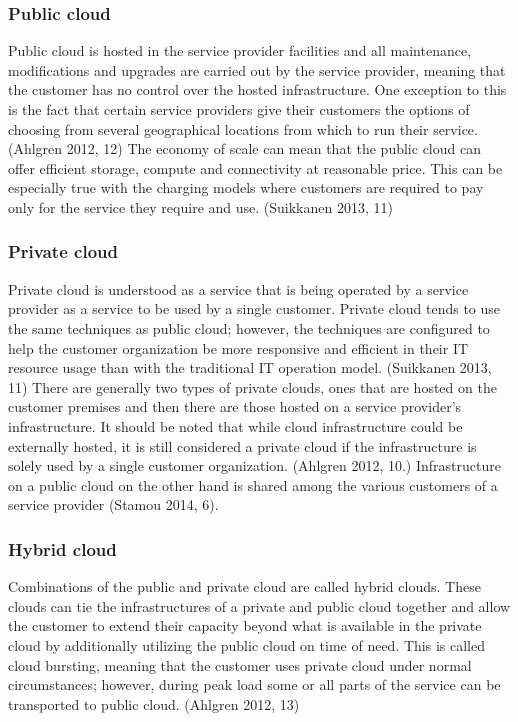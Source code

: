 \documentclass{article}
\begin{document}
\subsubsection{Public cloud}
Public cloud is hosted in the service provider facilities and all maintenance, modifications and upgrades are carried out by the service provider, meaning that the customer has no control over the hosted infrastructure. One exception to this is the fact that certain service providers give their customers the options of choosing from several geographical locations from which to run their service. (Ahlgren 2012, 12) 
The economy of scale can mean that the public cloud can offer efficient storage, compute and connectivity at reasonable price. This can be especially true with the charging models where customers are required to pay only for the service they require and use. (Suikkanen 2013, 11)
\subsubsection{Private cloud}
Private cloud is understood as a service that is being operated by a service provider as a service to be used by a single customer. Private cloud tends to use the same techniques as public cloud; however, the techniques are configured to help the customer organization be more responsive and efficient in their IT resource usage than with the traditional IT operation model. (Suikkanen 2013, 11)
There are generally two types of private clouds, ones that are hosted on the customer premises and then there are those hosted on a service provider's infrastructure. It should be noted that while cloud infrastructure could be externally hosted, it is still considered a private cloud if the infrastructure is solely used by a single customer organization. (Ahlgren 2012, 10.)
Infrastructure on a public cloud on the other hand is shared among the various customers of a service provider (Stamou 2014, 6).
\subsubsection{Hybrid cloud}
Combinations of the public and private cloud are called hybrid clouds. These clouds can tie the infrastructures of a private and public cloud together and allow the customer to extend their capacity beyond what is available in the private cloud by additionally utilizing the public cloud on time of need. This is called cloud bursting, meaning that the customer uses private cloud under normal circumstances; however, during peak load some or all parts of the service can be transported to public cloud. (Ahlgren 2012, 13)
\end{document}
